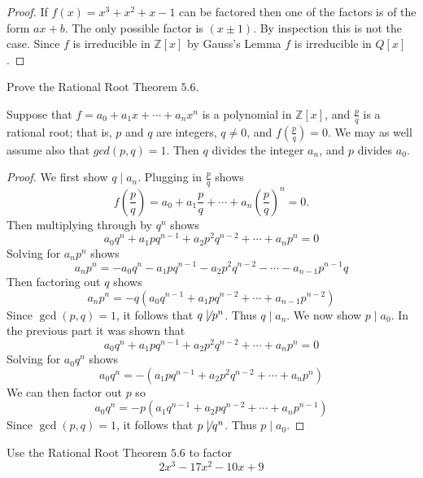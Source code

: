 \begin{proof}
    If $f(x) =  x^3 + x^2 + x - 1$ can be factored then one of 
        the factors is of the form $ax + b$.
    The only possible factor is $(x \pm 1)$.
    By inspection this is not the case.
    Since $f$ is irreducible in $\mathbb{Z}[x]$ by Gauss's Lemma $f$ is irreducible in $Q[x]$.
\end{proof}

\begin{tcolorbox}[title=Problem 6, breakable]
    Prove the Rational Root Theorem $5.6$.
\end{tcolorbox}

\begin{theorem}
    Suppose that $f = a_0 + a_1 x + \cdots + a_n x^n$
    is a polynomial in $\mathbb{Z}[x]$, and $\frac{p}{q}$ is 
    a rational root; that is, $p$ and $q$ are integers, $q \ne 0$,
    and $f\left(\frac{p}{q}\right) = 0$. We may as well assume also that 
    $gcd(p, q) = 1$. Then $q$ divides the integer $a_n$, and 
    $p$ divides $a_0$.
\end{theorem}

\begin{proof}
    We first show $q \mid a_n$.
    Plugging in $\frac{p}{q}$ shows 
    \[f\left(\frac{p}{q}\right) = a_0 + a_1 \frac{p}{q} + \cdots + a_n \left(\frac{p}{q}\right)^n = 0.\]
    Then multiplying through by $q^n$ shows 
    \[a_0 q^n + a_1 p q^{n - 1} + a_2 p^2 q^{n-2} + \cdots + a_n p^n = 0\]
    Solving for $a_n p^n$ shows 
    \[a_n p^n = - a_0 q^n - a_1 p q^{n - 1} - a_2 p^2 q^{n-2} - \cdots - a_{n - 1} p^{n-1} q\]
    Then factoring out $q$ shows 
    \[a_n p^n = -q(a_0 q^{n-1} + a_1 p q^{n - 2} + \cdots + a_{n - 1} p^{n-2})\]
    Since $\gcd(p, q) = 1$, it follows that $q \not \mid p^n$.
    Thus $q \mid a_n$.
    We now show $p \mid a_0$.
    In the previous part it was shown that 
    \[a_0 q^n + a_1 p q^{n - 1} + a_2 p^2 q^{n-2} + \cdots + a_n p^n = 0\]
    Solving for $a_0 q^n$ shows 
    \[a_0 q^n = -(a_1 p q^{n - 1} + a_2 p^2 q^{n-2} + \cdots + a_n p^n)\]
    We can then factor out $p$ so 
    \[a_0 q^n = -p(a_1 q^{n - 1} + a_2 p q^{n-2} + \cdots + a_n p^{n - 1})\]
    Since $\gcd(p, q) = 1$, it follows that $p \not \mid q^n$.
    Thus $p \mid a_0$.
\end{proof}

\begin{tcolorbox}[title=Problem 7, breakable]
    Use the Rational Root Theorem $5.6$ to factor 
    \[2x^3 - 17x^2 - 10x + 9\]
\end{tcolorbox}


